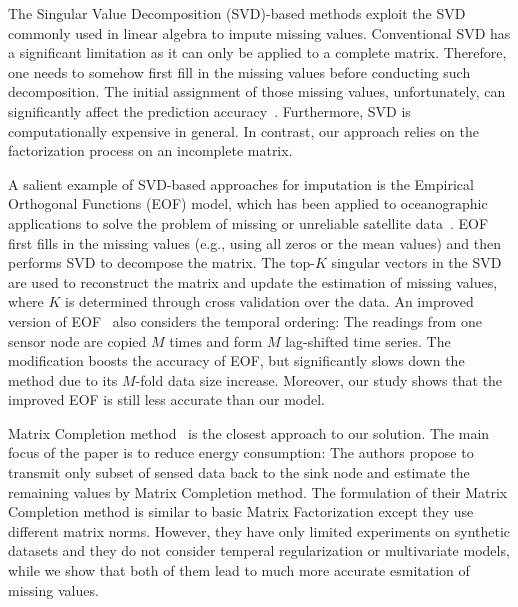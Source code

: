 The Singular Value Decomposition (SVD)-based methods exploit the SVD commonly used in linear algebra to impute missing values.
Conventional SVD has a significant
limitation as it can only be applied to a complete matrix.  Therefore,
one needs to somehow first fill in the missing values before
conducting such decomposition.  The initial assignment of those
missing values, unfortunately, can significantly affect the prediction
accuracy~\cite{koren2009matrix}.  Furthermore, SVD is computationally
expensive in general.  In contrast, our approach relies on the
factorization process on an incomplete matrix.


A salient example of SVD-based approaches for imputation is the Empirical Orthogonal Functions
(EOF) model, which has been applied to oceanographic applications to
solve the problem of missing or unreliable satellite
data~\cite{beckers2003eof}.  EOF first fills in the missing values
(e.g., using all zeros or the mean values) and then performs SVD 
to decompose the matrix. The top-$K$ singular vectors in the SVD are used 
to reconstruct the matrix and update the estimation of missing values, 
where $K$ is determined through cross validation over the data.
An improved version of EOF~\cite{kondrashov2006spatio} also 
considers the temporal ordering:
The readings from one sensor node are copied $M$ times and form $M$ lag-shifted time series.
The modification boosts the accuracy of EOF, but significantly slows down the method
due to its $M$-fold data size increase.
Moreover, our study shows that the improved EOF is still less accurate than our model.


Matrix Completion method~\cite{majumdar2011increasing} is the closest approach to our solution. 
The main focus of the paper is to reduce energy consumption: 
The authors propose to transmit only subset of sensed data back to the sink node and 
estimate the remaining values by Matrix Completion method. 
The formulation of their Matrix Completion method is similar to basic Matrix Factorization except they use different matrix norms.
However, they have only limited experiments on synthetic datasets and they do not consider temperal regularization or multivariate models, 
while we show that both of them lead to much more accurate esmitation of missing values.

